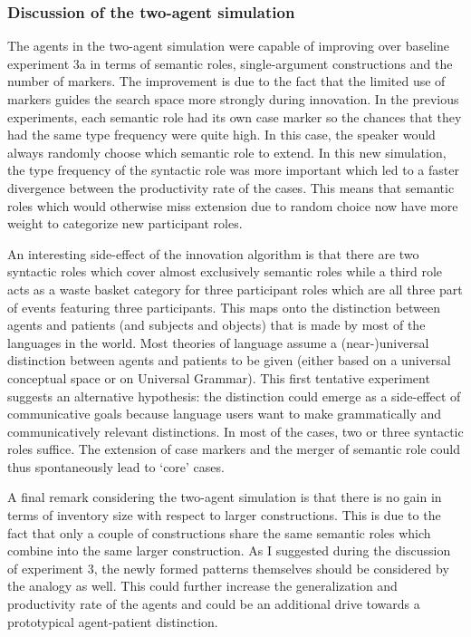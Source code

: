 \subsubsection{Discussion of the two-agent simulation}
 The agents in the two-agent simulation were capable of improving over baseline experiment 3a in terms of semantic roles, single-argument constructions and the number of markers. The improvement is due to the fact that the limited use of markers guides the search space more strongly during innovation. In the previous experiments, each semantic role had its own case marker so the chances that they had the same type frequency were quite high. In this case, the speaker would always randomly choose which semantic role to extend. In this new simulation, the type frequency of the syntactic role was more important which led to a faster divergence between the productivity rate of the cases. This means that semantic roles which would otherwise miss extension due to random choice now have more weight to categorize new participant roles.

An interesting side-effect of the innovation algorithm is that there are two syntactic roles which cover almost exclusively semantic roles while a third role acts as a waste basket category for three participant roles which are all three part of events featuring three participants. This maps onto the distinction between agents and patients (and subjects and objects) that is made by most of the languages in the world. Most theories of language assume a (near-)universal distinction between agents and patients to be given (either based on a universal conceptual space or on Universal Grammar). This first tentative experiment suggests an alternative hypothesis: the distinction could emerge as a side-effect of communicative goals because language users want to make grammatically and communicatively relevant distinctions. In most of the cases, two or three syntactic roles suffice. The extension of case markers and the merger of semantic role could thus spontaneously lead to `core' cases.

A final remark considering the two-agent simulation is that there is no gain in terms of inventory size with respect to larger constructions. This is due to the fact that only a couple of constructions share the same semantic roles which combine into the same larger construction. As I suggested during the discussion of experiment 3, the newly formed patterns themselves should be considered by the analogy as well. This could further increase the generalization and productivity rate of the agents and could be an additional drive towards a prototypical agent-patient distinction.
\\
\\
